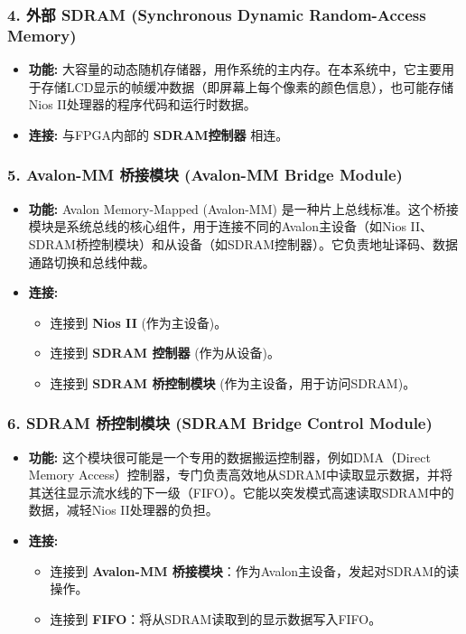 \documentclass[12pt,hyperref,a4paper,UTF8]{ctexart}
\begin{document}
\subsubsection*{4. 外部 SDRAM (Synchronous Dynamic Random-Access Memory)}
\begin{itemize}
    \item \textbf{功能:} 大容量的动态随机存储器，用作系统的主内存。在本系统中，它主要用于存储LCD显示的帧缓冲数据（即屏幕上每个像素的颜色信息），也可能存储Nios II处理器的程序代码和运行时数据。
    \item \textbf{连接:} 与FPGA内部的 \textbf{SDRAM控制器} 相连。
\end{itemize}

\subsubsection*{5. Avalon-MM 桥接模块 (Avalon-MM Bridge Module)}
\begin{itemize}
    \item \textbf{功能:} Avalon Memory-Mapped (Avalon-MM) 是一种片上总线标准。这个桥接模块是系统总线的核心组件，用于连接不同的Avalon主设备（如Nios II、SDRAM桥控制模块）和从设备（如SDRAM控制器）。它负责地址译码、数据通路切换和总线仲裁。
    \item \textbf{连接:}
    \begin{itemize}
        \item 连接到 \textbf{Nios II} (作为主设备)。
        \item 连接到 \textbf{SDRAM 控制器} (作为从设备)。
        \item 连接到 \textbf{SDRAM 桥控制模块} (作为主设备，用于访问SDRAM)。
    \end{itemize}
\end{itemize}

\subsubsection*{6. SDRAM 桥控制模块 (SDRAM Bridge Control Module)}
\begin{itemize}
    \item \textbf{功能:} 这个模块很可能是一个专用的数据搬运控制器，例如DMA（Direct Memory Access）控制器，专门负责高效地从SDRAM中读取显示数据，并将其送往显示流水线的下一级（FIFO）。它能以突发模式高速读取SDRAM中的数据，减轻Nios II处理器的负担。
    \item \textbf{连接:}
    \begin{itemize}
        \item 连接到 \textbf{Avalon-MM 桥接模块}：作为Avalon主设备，发起对SDRAM的读操作。
        \item 连接到 \textbf{FIFO}：将从SDRAM读取到的显示数据写入FIFO。
    \end{itemize}
\end{itemize}
\end{document}
